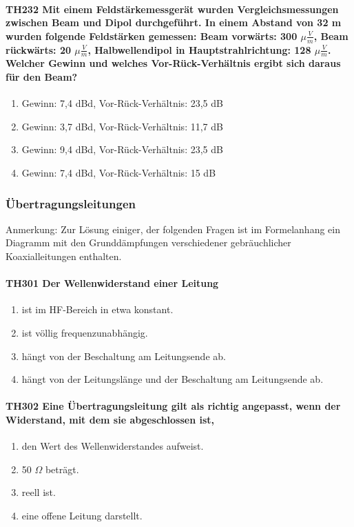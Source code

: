 \documentclass[8pt]{article}
\begin{document}
\paragraph*{TH232 Mit einem Feldstärkemessgerät wurden Vergleichsmessungen zwischen Beam und Dipol durchgeführt. In einem Abstand von 32 m wurden folgende Feldstärken gemessen: Beam vorwärts: 300 $\mu\frac{V}{m}$, Beam rückwärts: 20 $\mu\frac{V}{m}$, Halbwellendipol in Hauptstrahlrichtung: 128 $\mu\frac{V}{m}$. Welcher Gewinn und welches Vor-Rück-Verhältnis ergibt sich daraus für den Beam?}
\begin{enumerate}[nolistsep,label=\Alph*]
\item Gewinn: 7,4 dBd, Vor-Rück-Verhältnis: 23,5 dB
\item Gewinn: 3,7 dBd, Vor-Rück-Verhältnis: 11,7 dB
\item Gewinn: 9,4 dBd, Vor-Rück-Verhältnis: 23,5 dB
\item Gewinn: 7,4 dBd, Vor-Rück-Verhältnis: 15 dB
\end{enumerate}

\pagebreak
\subsubsection{Übertragungsleitungen}
Anmerkung: Zur Lösung einiger, der folgenden Fragen ist im Formelanhang ein Diagramm mit den Grunddämpfungen verschiedener gebräuchlicher Koaxialleitungen enthalten. 
\paragraph*{TH301 Der Wellenwiderstand einer Leitung}
\begin{enumerate}[nolistsep,label=\Alph*]
\item ist im HF-Bereich in etwa konstant. 
\item ist völlig frequenzunabhängig.
\item hängt von der Beschaltung am Leitungsende ab.
\item hängt von der Leitungslänge und der Beschaltung am Leitungsende ab.
\end{enumerate}

\paragraph*{TH302 Eine Übertragungsleitung gilt als richtig angepasst, wenn der Widerstand, mit dem sie abgeschlossen ist,} 
\begin{enumerate}[nolistsep,label=\Alph*]
\item den Wert des Wellenwiderstandes aufweist.
\item 50 $\Omega$ beträgt.
\item reell ist.
\item eine offene Leitung darstellt.
\end{enumerate}
\end{document}
